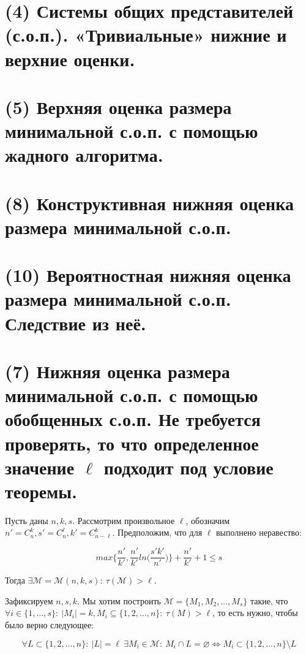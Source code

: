 \section{(4) Системы общих представителей (с.о.п.). «Тривиальные» нижние и верхние оценки.}

\newpage{}

\section{(5) Верхняя оценка размера минимальной с.о.п. с помощью жадного алгоритма.}

\newpage{}


\section{(8) Конструктивная нижняя оценка размера минимальной с.о.п.}

\newpage{}

\section{(10) Вероятностная нижняя оценка размера минимальной с.о.п. Следствие из неё.}

\newpage{}

\section{(7) Нижняя оценка размера минимальной с.о.п. с помощью обобщенных с.о.п. Не требуется проверять, то что определенное значение $\ell$ подходит под условие теоремы.}

\Th Пусть даны $n, k, s$. Рассмотрим произвольное $\ell$, обозначим $n' = C_n^k, s' = C_n^{\ell}, k' = C_{n - \ell}^k$. Предположим, что для $\ell$ выполнено неравество:

$$
max\{ \frac{n'}{k'}, \frac{n'}{k'} ln\bigg(\frac{s' k'}{n'}\bigg)\} + \frac{n'}{k'} + 1 \leq s
$$

Тогда $\exists \mathcal{M} = \mathcal{M}(n, k, s): \ \tau(\mathcal{M}) > \ell$.

\Proof Зафиксируем $n, s, k$. Мы хотим построить $\mathcal{M} = \{M_1, M_2, \ldots, M_s\}$ такие, что $\forall i \in \{1, \dots, s\}: \ |M_i| = k, M_i \subseteq \{1, 2, \ldots, n\}: \ \tau(M) > \ell$, то есть нужно, чтобы было верно следующее: 

$$
\forall L \subset \{1, 2, \ldots, n\}: \ |L| = \ell \ \exists M_i \in \mathcal{M}: \ M_i \cap L = \varnothing \Longleftrightarrow M_i \subset \{1, 2, \ldots, n\} \setminus L
$$

